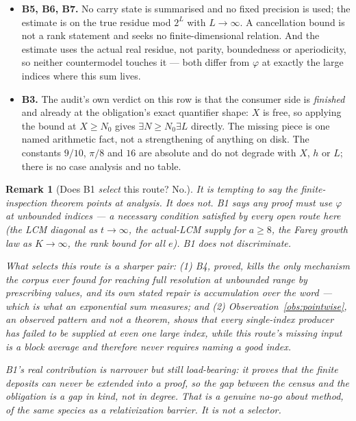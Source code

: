 \documentclass[11pt]{article}
\theoremstyle{breakplain}
\theoremstyle{breakdefinition}
\theoremstyle{breakdefinition}
\newtheorem{rem}[thm]{Remark}
\begin{document}
\begin{itemize}[leftmargin=*]
  (Remark~\ref{rem:b4}) is to impose the structure on the word rather than on
  one delta, which is exactly what a block exponential-sum bound does.
\item \textbf{B5, B6, B7.} No carry state is summarised and no fixed precision
  is used; the estimate is on the true residue mod $2^{L}$ with $L \to \infty$.
  A cancellation bound is not a rank statement and seeks no finite-dimensional
  relation. And the estimate uses the actual real residue, not parity,
  boundedness or aperiodicity, so neither countermodel touches it --- both
  differ from $\varphi$ at exactly the large indices where this sum lives.
\item \textbf{B3.} The audit's own verdict on this row is that the consumer
  side is \emph{finished} and already at the obligation's exact quantifier
  shape: $X$ is free, so applying the bound at $X \ge N_0$ gives
  $\exists N \ge N_0 \exists L$ directly. The missing piece is one named
  arithmetic fact, not a strengthening of anything on disk. The constants
  $9/10$, $\pi/8$ and $16$ are absolute and do not degrade with $X$, $h$ or
  $L$; there is no case analysis and no table.
\end{itemize}

\begin{rem}[Does B1 \emph{select} this route? No.]
\label{rem:b1-not-selector}
It is tempting to say the finite-inspection theorem points at analysis. It does
not. B1 says any proof must use $\varphi$ at unbounded indices --- a necessary
condition satisfied by \emph{every} open route here (the LCM diagonal as
$t \to \infty$, the actual-LCM supply for $a \ge 8$, the Farey growth law as
$K \to \infty$, the rank bound for all $e$). B1 does not discriminate.

\par\medskip

What selects this route is a sharper pair: (1) B4, proved, kills the only mechanism
the corpus ever found for reaching full resolution at unbounded range by
\emph{prescribing} values, and its own stated repair is accumulation over the
word --- which is what an exponential sum measures; and (2)
Observation~\ref{obs:pointwise}, an observed pattern and not a theorem, shows
that every single-index producer has failed to be supplied at even one large
index, while this route's missing input is a block average and therefore never
requires naming a good index.

\par\medskip

B1's real contribution is narrower but still load-bearing: it proves that the finite deposits can never be extended into a
proof, so the gap between the census and the obligation is a gap in kind, not
in degree. That is a genuine no-go about method, of the same species as a
relativization barrier. It is not a selector.
\end{rem}
\end{document}
